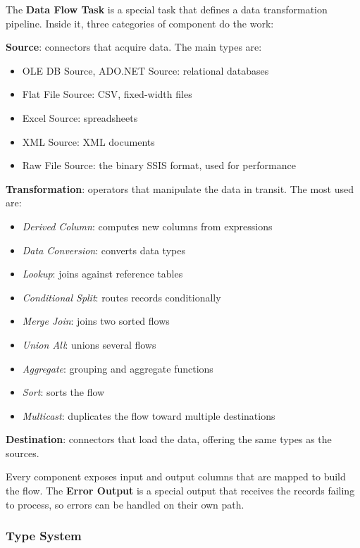 The \textbf{Data Flow Task} is a special task that defines a data transformation pipeline. Inside it, three categories of component do the work:

\textbf{Source}: connectors that acquire data. The main types are:
\begin{itemize}
    \item OLE DB Source, ADO.NET Source: relational databases
    \item Flat File Source: CSV, fixed-width files
    \item Excel Source: spreadsheets
    \item XML Source: XML documents
    \item Raw File Source: the binary SSIS format, used for performance
\end{itemize}

\textbf{Transformation}: operators that manipulate the data in transit. The most used are:
\begin{itemize}
    \item \textit{Derived Column}: computes new columns from expressions
    \item \textit{Data Conversion}: converts data types
    \item \textit{Lookup}: joins against reference tables
    \item \textit{Conditional Split}: routes records conditionally
    \item \textit{Merge Join}: joins two sorted flows
    \item \textit{Union All}: unions several flows
    \item \textit{Aggregate}: grouping and aggregate functions
    \item \textit{Sort}: sorts the flow
    \item \textit{Multicast}: duplicates the flow toward multiple destinations
\end{itemize}

\textbf{Destination}: connectors that load the data, offering the same types as the sources.

Every component exposes input and output columns that are mapped to build the flow. The \textbf{Error Output} is a special output that receives the records failing to process, so errors can be handled on their own path.

\subsubsection{Type System}
\label{subsec:ssis-type-system}

